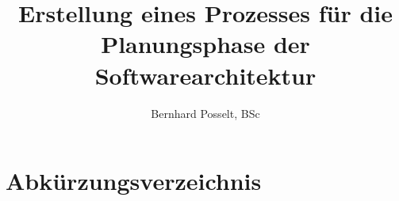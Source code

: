 \documentclass[Master,MSE,german]{twbook}
\title{Erstellung eines Prozesses für die Planungsphase der Softwarearchitektur}
\author{Bernhard Posselt, BSc}
\begin{document}
\maketitle











\clearpage


\clearpage

\listoffigures
\clearpage


{}
\chapter*{Abkürzungsverzeichnis}
\begin{acronym}[XXXXX]
    
\end{acronym}
\clearpage
\end{document}
